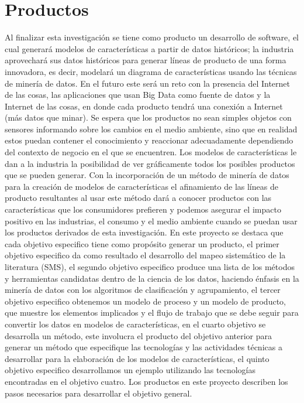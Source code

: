 \chapter*{Productos}

Al finalizar esta investigación se tiene como producto un desarrollo de software, el cual generará modelos de características a partir de datos históricos; la industria aprovechará sus datos históricos para generar líneas de producto de una forma innovadora, es decir, modelará un diagrama de características usando las técnicas de minería de datos. En el futuro este será un reto con la presencia del Internet de las cosas, las aplicaciones que usan Big Data como fuente de datos y la Internet de las cosas, en donde cada producto tendrá una conexión a Internet (más datos que minar). Se espera que los productos no sean simples objetos con sensores informando sobre los cambios en el medio ambiente, sino que en realidad estos puedan contener el conocimiento y reaccionar adecuadamente dependiendo del contexto de negocio en el que se encuentren. Los modelos de características  le dan a la industria la posibilidad de ver gráficamente todos los posibles productos que se pueden generar. Con la incorporación de un método de minería de datos para la creación de modelos de características el afinamiento de las líneas de producto resultantes al usar este método dará a conocer productos con las características que los consumidores prefieren y podemos asegurar el impacto positivo en las industrias, el consumo y el medio ambiente cuando se puedan usar los productos derivados de esta investigación. 
En este proyecto se destaca que cada objetivo especifico tiene como propósito generar un producto, el primer objetivo especifico da como resultado el desarrollo del mapeo sistemático de la literatura (SMS), el segundo objetivo especifico produce una lista de los métodos y herramientas candidatas dentro de la ciencia de los datos, haciendo énfasis en la minería de datos con los algoritmos de clasificación y agrupamiento, el tercer objetivo especifico obtenemos un modelo de proceso y un modelo de producto, que muestre los elementos implicados y el flujo de trabajo que se debe seguir para convertir los datos en modelos de características, en el cuarto objetivo se desarrolla un método, este involucra el producto del objetivo anterior para generar un método que especifique las tecnologías y las actividades técnicas a desarrollar para la elaboración de los modelos de características, el quinto objetivo especifico desarrollamos un ejemplo utilizando las tecnologías encontradas en el objetivo cuatro. Los productos en este proyecto describen los pasos necesarios para desarrollar el objetivo general.  


